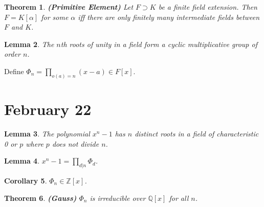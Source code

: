 \documentclass[letterpaper]{article}
\newtheorem{theorem}{Theorem}[section]
\newtheorem{lemma}[theorem]{Lemma}
\newtheorem{corollary}[theorem]{Corollary}
\begin{document}
\begin{theorem}
\emph{\textbf{(Primitive Element)}}
Let $F \supset K$ be a finite field extension. Then $F = K[\alpha]$ for some $\alpha$ iff there are only finitely many intermediate fields between $F$ and $K$.
\end{theorem}

\begin{lemma}
The $n$th roots of unity in a field form a cyclic multiplicative group of order $n$.
\end{lemma}

Define $\Phi_n = \displaystyle\prod_{o(a) = n} (x - a) \in F[x]$.

\section{February 22}

\begin{lemma}
The polynomial $x^n - 1$ has $n$ distinct roots in a field of characteristic 0 or $p$ where $p$ does not divide $n$.
\end{lemma}

\begin{lemma}
$x^n - 1 = \displaystyle\prod_{d | n} \Phi_d$.
\end{lemma}

\begin{corollary}
$\Phi_n \in \mathbb{Z}[x]$.
\end{corollary}

\begin{theorem}
\emph{\textbf{(Gauss)}}
$\Phi_n$ is irreducible over $\mathbb{Q}[x]$ for all $n$.
\end{theorem}
\end{document}

